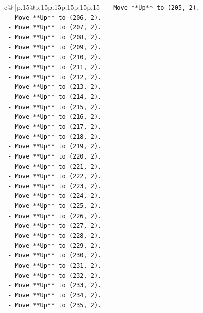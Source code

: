 \documentclass{article}
\begin{document}
{\begin{supertabular}{c@{$\;$}|p{.15\linewidth}@{}p{.15\linewidth}p{.15\linewidth}p{.15\linewidth}p{.15\linewidth}p{.15\linewidth}}
{{{\texttt{    {-} Move **Up** to (205, 2).} \\
\texttt{    {-} Move **Up** to (206, 2).} \\
\texttt{    {-} Move **Up** to (207, 2).} \\
\texttt{    {-} Move **Up** to (208, 2).} \\
\texttt{    {-} Move **Up** to (209, 2).} \\
\texttt{    {-} Move **Up** to (210, 2).} \\
\texttt{    {-} Move **Up** to (211, 2).} \\
\texttt{    {-} Move **Up** to (212, 2).} \\
\texttt{    {-} Move **Up** to (213, 2).} \\
\texttt{    {-} Move **Up** to (214, 2).} \\
\texttt{    {-} Move **Up** to (215, 2).} \\
\texttt{    {-} Move **Up** to (216, 2).} \\
\texttt{    {-} Move **Up** to (217, 2).} \\
\texttt{    {-} Move **Up** to (218, 2).} \\
\texttt{    {-} Move **Up** to (219, 2).} \\
\texttt{    {-} Move **Up** to (220, 2).} \\
\texttt{    {-} Move **Up** to (221, 2).} \\
\texttt{    {-} Move **Up** to (222, 2).} \\
\texttt{    {-} Move **Up** to (223, 2).} \\
\texttt{    {-} Move **Up** to (224, 2).} \\
\texttt{    {-} Move **Up** to (225, 2).} \\
\texttt{    {-} Move **Up** to (226, 2).} \\
\texttt{    {-} Move **Up** to (227, 2).} \\
\texttt{    {-} Move **Up** to (228, 2).} \\
\texttt{    {-} Move **Up** to (229, 2).} \\
\texttt{    {-} Move **Up** to (230, 2).} \\
\texttt{    {-} Move **Up** to (231, 2).} \\
\texttt{    {-} Move **Up** to (232, 2).} \\
\texttt{    {-} Move **Up** to (233, 2).} \\
\texttt{    {-} Move **Up** to (234, 2).} \\
\texttt{    {-} Move **Up** to (235, 2).} \\
}}}
\end{supertabular}}
\end{document}
